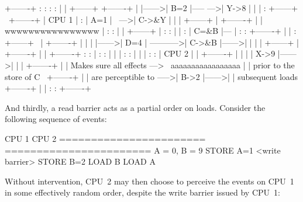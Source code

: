 \begin{VerbatimU}
	+-------+       :      :                :       :
	|       |       +------+                +-------+
	|       |------>| B=2  |-----       --->| Y->8  |
	|       |  :    +------+     \          +-------+
	| CPU 1 |  :    | A=1  |      \     --->| C->&Y |
	|       |       +------+       |        +-------+
	|       |   wwwwwwwwwwwwwwww   |        :       :
	|       |       +------+       |        :       :
	|       |  :    | C=&B |---    |        :       :       +-------+
	|       |  :    +------+   \   |        +-------+       |       |
	|       |------>| D=4  |    ----------->| C->&B |------>|       |
	|       |       +------+       |        +-------+       |       |
	+-------+       :      :       |        :       :       |       |
	                               |        :       :       |       |
	                               |        :       :       | CPU 2 |
	                               |        +-------+       |       |
	                               |        | X->9  |------>|       |
	                               |        +-------+       |       |
	  Makes sure all effects --->   \   aaaaaaaaaaaaaaaaa   |       |
	  prior to the store of C        \      +-------+       |       |
	  are perceptible to              ----->| B->2  |------>|       |
	  subsequent loads                      +-------+       |       |
	                                        :       :       +-------+
\end{VerbatimU}

And thirdly, a read barrier acts as a partial order on loads.
Consider the following sequence of events:

\begin{VerbatimU}
	CPU 1                   CPU 2
	=======================	=======================
		{ A = 0, B = 9 }
	STORE A=1
	<write barrier>
	STORE B=2
	                        LOAD B
	                        LOAD A
\end{VerbatimU}

Without intervention, CPU~2 may then choose to perceive the events on CPU~1 in
some effectively random order, despite the write barrier issued by CPU~1:

